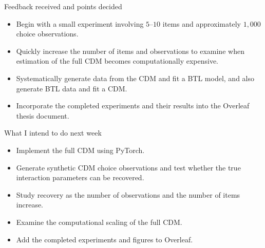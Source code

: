 \documentclass[10pt]{article}
\begin{document}
\begin{weeklybox}{Feedback received and points decided}

  \small

  \begin{itemize}

    \item Begin with a small experiment involving \(5\)--\(10\) items
    and approximately \(1{,}000\) choice observations.

    \item Quickly increase the number of items and observations to
    examine when estimation of the full CDM becomes computationally
    expensive.

    \item Systematically generate data from the CDM and fit a BTL
    model, and also generate BTL data and fit a CDM.

    \item Incorporate the completed experiments and their results into
    the Overleaf thesis document.

  \end{itemize}

\end{weeklybox}

\begin{weeklybox}{What I intend to do next week}

  \small

  \begin{itemize}

    \item Implement the full CDM using PyTorch.

    \item Generate synthetic CDM choice observations and test whether
    the true interaction parameters can be recovered.

    \item Study recovery as the number of observations and the number
    of items increase.

    \item Examine the computational scaling of the full CDM.

    \item Add the completed experiments and figures to Overleaf.

  \end{itemize}

\end{weeklybox}
\end{document}
